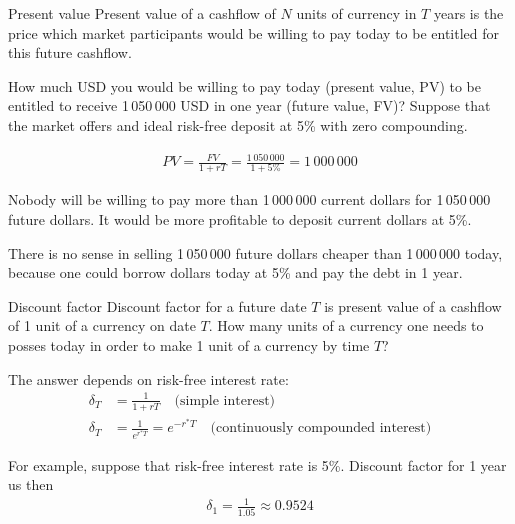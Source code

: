 \documentclass{beamer}
\begin{document}
\begin{frame}{Present value}
\justify
\alert{Present value} of a cashflow of $N$ units of currency in $T$ years is the price which market participants would be willing to pay today to be entitled for this future cashflow.

\justify
How much USD you would be willing to pay today (present value, PV) to be entitled to receive 1\,050\,000 USD in one year (future value, FV)? Suppose that the market offers and ideal risk-free deposit at 5\% with zero compounding.

\begin{align*}
PV = \frac{FV}{1+rT} = \frac{1\,050\,000}{1 + 5\%} = 1\,000\,000
\end{align*}

\justify
Nobody will be willing to pay more than 1\,000\,000 current dollars for 1\,050\,000 future dollars. It would be more profitable to deposit current dollars at 5\%.

\justify
There is no sense in selling 1\,050\,000 future dollars cheaper than 1\,000\,000 today, because one could borrow dollars today at 5\% and pay the debt in 1 year.
\end{frame}



\begin{frame}{Discount factor}
\justify
\alert{Discount factor} for a future date $T$ is present value of a cashflow of 1 unit of a currency on date $T$. How many units of a currency one needs to posses today in order to make 1 unit of a currency by time $T$?

\justify
The answer depends on risk-free interest rate:
\begin{align*}
\delta_T &= \frac{1}{1 + rT} \quad \text{(simple interest)} \\
\delta_T &= \frac{1}{e^{r^*T}} = e^{-r^*T} \quad \text{(continuously compounded interest)}
\end{align*}

\justify
For example, suppose that risk-free interest rate is 5\%.  Discount factor for 1 year us then
\begin{align*}
\delta_1 = \frac{1}{1.05} \approx 0.9524
\end{align*}
\end{frame}
\end{document}
